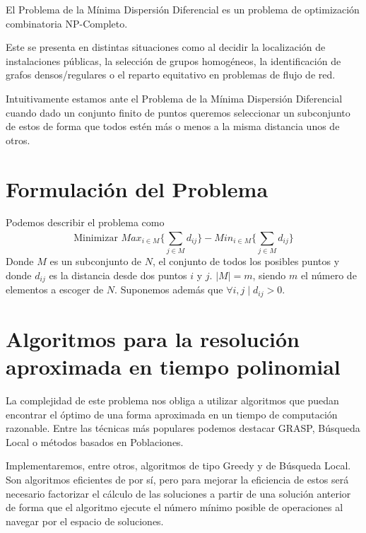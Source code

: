 
El Problema de la Mínima Dispersión Diferencial es un problema de optimización combinatoria NP-Completo.\cite{Seminario2MH}

Este se presenta en distintas situaciones como al decidir la localización de instalaciones públicas,
la selección de grupos homogéneos, la identificación de grafos densos/regulares o el reparto equitativo en problemas de
flujo de red.\cite{DUARTE201546}

Intuitivamente estamos ante el Problema de la Mínima Dispersión Diferencial cuando dado un conjunto finito de puntos queremos
seleccionar un subconjunto de estos de forma que todos estén más o menos a la misma distancia unos de otros.

\section{Formulación del Problema}

Podemos describir el problema como
$$\textrm{Minimizar } Max_{i\in M}\{\sum_{j\in M}^{}d_{ij}\}-Min_{i\in M}\{\sum_{j\in M}^{}d_{ij}\} $$
Donde $M$ es un subconjunto de $N$, el conjunto de todos los posibles puntos y donde $d_{ij}$ es la distancia desde dos puntos $i$ y $j$.
$|M| = m$, siendo $m$ el número de elementos a escoger de $N$. Suponemos además que $\forall i,j\;|\;d_{ij} > 0$.

\section{Algoritmos para la resolución aproximada en tiempo polinomial}

La complejidad de este problema nos obliga a utilizar algoritmos que puedan encontrar el óptimo de una forma aproximada en un tiempo de computación razonable.
Entre las técnicas más populares podemos destacar GRASP, Búsqueda Local o métodos basados en Poblaciones.\cite{MDP2010}

Implementaremos, entre otros, algoritmos de tipo Greedy y de Búsqueda Local. Son algoritmos eficientes de por sí, pero para
mejorar la eficiencia de estos será necesario factorizar el cálculo de las soluciones a partir de una solución anterior de forma
que el algoritmo ejecute el número mínimo posible de operaciones al navegar por el espacio de soluciones.